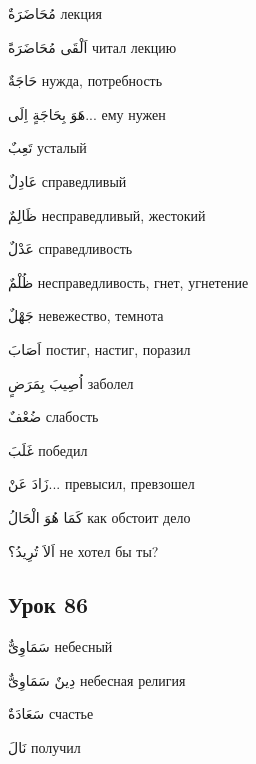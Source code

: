 \documentclass[a5paper]{article}
\newcommand\textstyleDropCaps[1]{#1}
\newcommand\textstyleCaptioncharacters[1]{#1}
\begin{document}
\textstyleCaptioncharacters{مُحَاضَرَةٌ }\textstyleDropCaps{лекция‎}

\textstyleCaptioncharacters{اَلْقَى مُحَاضَرَةً }\textstyleDropCaps{читал лекцию‎}

\textstyleCaptioncharacters{حَاجَةٌ }\textstyleDropCaps{нужда, потреб­ность‎}

\textstyleCaptioncharacters{هَوَ بِحَاجَةٍ اِلَى... }\textstyleDropCaps{ему нужен‎}

\textstyleCaptioncharacters{تَعِبٌ }\textstyleDropCaps{усталый‎}

\textstyleCaptioncharacters{عَادِلٌ }\textstyleDropCaps{справедливый‎}

\textstyleCaptioncharacters{ظَالِمٌ }\textstyleDropCaps{несправедливый, же­стокий‎}

\textstyleCaptioncharacters{عَدْلٌ }\textstyleDropCaps{справедливость‎}

\textstyleCaptioncharacters{ظُلْمٌ }\textstyleDropCaps{несправедливость, гнет, угнетение‎}

\textstyleCaptioncharacters{جَهْلٌ }\textstyleDropCaps{невежество, темно­та‎}

\textstyleCaptioncharacters{اَصَابَ }\textstyleDropCaps{постиг, настиг, по­разил‎}

\textstyleCaptioncharacters{اُصِيبَ بِمَرَضٍ }\textstyleDropCaps{заболел‎}

\textstyleCaptioncharacters{ضُعْفٌ }\textstyleDropCaps{слабость‎}

\textstyleCaptioncharacters{غَلَبَ }\textstyleDropCaps{победил‎}

\textstyleCaptioncharacters{زَادَ عَنْ... }\textstyleDropCaps{превысил, пре­взошел‎}

\textstyleCaptioncharacters{كَمَا هُوَ الْحَالُ }\textstyleDropCaps{как об­стоит дело‎}

\textstyleCaptioncharacters{اَلاَ تُرِيدُ؟ }\textstyleDropCaps{не хотел бы ты?‎}

\subsection[Урок 86‎]{\textstyleDropCaps{Урок 86‎}}
\textstyleCaptioncharacters{سَمَاوِىٌّ }\textstyleDropCaps{небесный‎}

\textstyleCaptioncharacters{دِينٌ سَمَاوِىٌّ }\textstyleDropCaps{небесная религия‎}

\textstyleCaptioncharacters{سَعَادَةٌ }\textstyleDropCaps{счастье‎}

\textstyleCaptioncharacters{نَالَ }\textstyleDropCaps{получил‎}
\end{document}

